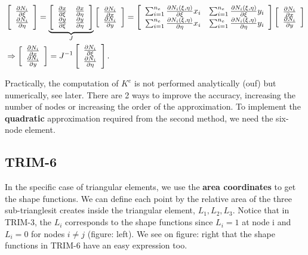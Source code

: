 	\begin{equation}
	\begin{aligned}
	&\left[
	\begin{array}{c}
	\frac{\D N_i}{\D \xi}\\
	\frac{\D N_i}{\D \eta}
	\end{array}
	\right]
	=
	\underbrace{
	\left[
	\begin{array}{cc}
	\frac{\D x}{\D \xi} & \frac{\D x}{\D \eta}\\
	\frac{\D y}{\D \xi} & \frac{\D y}{\D \eta}
	\end{array}
	\right]
	}_{J}
	\left[
	\begin{array}{c}
	\frac{\D N_i}{\D x}\\
	\frac{\D N_i}{\D y}
	\end{array}
	\right]
	=
	\left[
	\begin{array}{cc}
	\sum _{i=1}^{n_e} \frac{\D N_i(\xi, \eta)}{\D \xi}x_i & \sum _{i=1}^{n_e} \frac{\D N_i(\xi, \eta)}{\D \xi}y_i\\
	\sum _{i=1}^{n_e} \frac{\D N_i(\xi, \eta)}{\D \eta}x_i & \sum _{i=1}^{n_e} \frac{\D N_i(\xi, \eta)}{\D \eta}y_i
	\end{array}
	\right]
		\left[
	\begin{array}{c}
	\frac{\D N_i}{\D x}\\
	\frac{\D N_i}{\D y}
	\end{array}
	\right]\\
	&\Rightarrow 
		\left[
	\begin{array}{c}
	\frac{\D N_i}{\D x}\\
	\frac{\D N_i}{\D y}
	\end{array}
	\right]
	= J^{-1}
	\left[
	\begin{array}{c}
	\frac{\D N_i}{\D \xi}\\
	\frac{\D N_i}{\D \eta}
	\end{array}
	\right].
	\end{aligned}
	\end{equation}
	
	Practically, the computation of $K^e$ is not performed analytically (ouf) but numerically, see later. There are 2 ways to improve the accuracy, increasing the number of nodes or increasing the order of the approximation. To implement the \textbf{quadratic} approximation required from the second method, we need the six-node element. 
	
\subsection{TRIM-6}
	In the specific case of triangular elements, we use the \textbf{area coordinates} to get the shape functions. We can define each point by the relative area of the three sub-trianglesit creates inside the triangular element, $L_1,L_2,L_3$. Notice that in TRIM-3, the $L_i$ corresponds to the shape functions since $L_i = 1$ at node i and $L_i = 0$ for nodes $i\neq j$ (figure: left).  We see on figure: right that the shape functions in TRIM-6 have an easy expression too. \\
	
